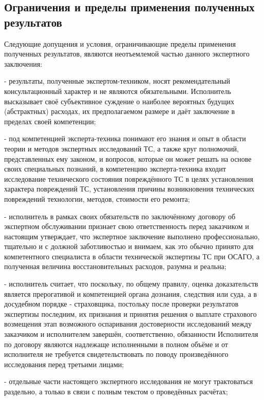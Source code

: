 \subsection{Ограничения и пределы применения полученных результатов}

Следующие допущения и условия, ограничивающие пределы применения полученных результатов, являются неотъемлемой частью данного экспертного заключения:
      
\noindent  - результаты, полученные экспертом-техником, носят рекомендательный консультационный характер и не являются обязательными. Исполнитель высказывает своё субъективное суждение о наиболее вероятных будущих (абстрактных) расходах, их предполагаемом размере и даёт заключение в пределах своей компетенции;

\noindent - под компетенцией эксперта-техника понимают его знания и опыт в области теории и методов экспертных исследований ТС, а также круг полномочий, представленных ему законом, и вопросов, которые он может решать на основе своих специальных познаний, в компетенцию эксперта-техника входит исследование технического состояния повреждённого ТС в целях установления характера повреждений ТС, установления причины возникновения технических повреждений технологии, методов, стоимости его ремонта;

\noindent - исполнитель в рамках своих обязательств по заключённому договору об экспертном обслуживании признает свою ответственность перед заказчиком и настоящим утверждает, что экспертное заключение выполнено профессионально, тщательно и с должной заботливостью и внимаем, как это обычно принято для компетентного специалиста в области технической экспертизы ТС при ОСАГО, а полученная величина восстановительных расходов, разумна и реальна;

\noindent - исполнитель считает, что поскольку, по общему правилу, оценка доказательств является прерогативой и компетенцией органа дознания, следствия или суда, а в досудебном порядке - страховщика, постольку после проверки результатов экспертизы последним, их признания и принятия решения о выплате страхового возмещения этап возможного оспаривания достоверности исследований между заказчиком и исполнителем завершён,  соответственно, обязанности Исполнителя по договору являются надлежаще исполненными в полном объёме и от исполнителя не требуется свидетельствовать по поводу произведённого исследования перед третьими лицами;

\noindent - отдельные части настоящего экспертного исследования не могут трактоваться раздельно, а только в связи с полным текстом о проведённых расчётах;


